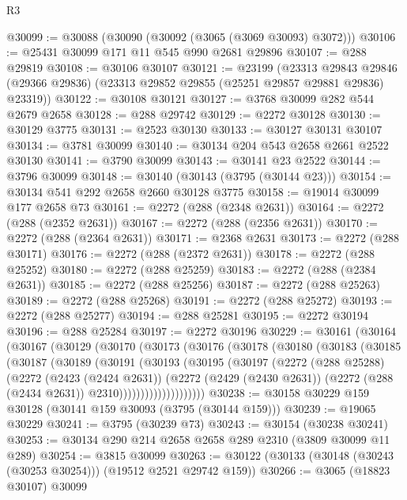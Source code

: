 \begin{lexlean}{R3}
\begin{coremodule}
@30099 := @30088 (@30090 (@30092 (@3065 (@3069 @30093) @3072)))
@30106 := @25431 @30099 @171 @11 @545 @990 @2681 @29896
@30107 := @288 @29819
@30108 := @30106 @30107
@30121 := @23199
    (@23313
      @29843
      @29846
      (@29366 @29836)
      (@23313 @29852 @29855 (@25251 @29857 @29881 @29836) @23319))
@30122 := @30108 @30121
@30127 := @3768 @30099 @282 @544 @2679 @2658
@30128 := @288 @29742
@30129 := @2272 @30128
@30130 := @30129 @3775
@30131 := @2523 @30130
@30133 := @30127 @30131 @30107
@30134 := @3781 @30099
@30140 := @30134 @204 @543 @2658 @2661 @2522 @30130
@30141 := @3790 @30099
@30143 := @30141 @23 @2522
@30144 := @3796 @30099
@30148 := @30140 (@30143 (@3795 (@30144 @23)))
@30154 := @30134 @541 @292 @2658 @2660 @30128 @3775
@30158 := @19014 @30099 @177 @2658 @73
@30161 := @2272 (@288 (@2348 @2631))
@30164 := @2272 (@288 (@2352 @2631))
@30167 := @2272 (@288 (@2356 @2631))
@30170 := @2272 (@288 (@2364 @2631))
@30171 := @2368 @2631
@30173 := @2272 (@288 @30171)
@30176 := @2272 (@288 (@2372 @2631))
@30178 := @2272 (@288 @25252)
@30180 := @2272 (@288 @25259)
@30183 := @2272 (@288 (@2384 @2631))
@30185 := @2272 (@288 @25256)
@30187 := @2272 (@288 @25263)
@30189 := @2272 (@288 @25268)
@30191 := @2272 (@288 @25272)
@30193 := @2272 (@288 @25277)
@30194 := @288 @25281
@30195 := @2272 @30194
@30196 := @288 @25284
@30197 := @2272 @30196
@30229 := @30161
    (@30164
      (@30167
        (@30129
          (@30170
            (@30173
              (@30176
                (@30178
                  (@30180
                    (@30183
                      (@30185
                        (@30187
                          (@30189
                            (@30191
                              (@30193
                                (@30195
                                  (@30197
                                    (@2272
                                      (@288 @25288)
                                      (@2272
                                        (@2423 (@2424 @2631))
                                        (@2272
                                          (@2429 (@2430 @2631))
                                          (@2272 (@288 (@2434 @2631)) @2310))))))))))))))))))))
@30238 := @30158 @30229 @159 @30128 (@30141 @159 @30093 (@3795 (@30144 @159)))
@30239 := @19065 @30229
@30241 := @3795 (@30239 @73)
@30243 := @30154 (@30238 @30241)
@30253 := @30134 @290 @214 @2658 @2658 @289 @2310 (@3809 @30099 @11 @289)
@30254 := @3815 @30099
@30263 := @30122 (@30133 (@30148 (@30243 (@30253 @30254))) (@19512 @2521 @29742 @159))
@30266 := @3065 (@18823 @30107) @30099

\end{coremodule}
\end{lexlean}
